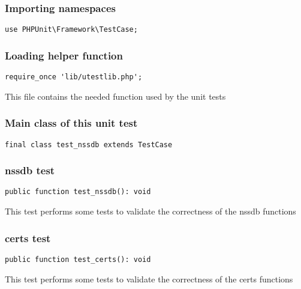 \documentclass[a4paper]{article}
\begin{document}
\subsubsection{Importing namespaces}

\begin{lstlisting}
use PHPUnit\Framework\TestCase;
\end{lstlisting}

\hypertarget{toc274}{}
\subsubsection{Loading helper function}

\begin{lstlisting}
require_once 'lib/utestlib.php';
\end{lstlisting}

This file contains the needed function used by the unit tests

\hypertarget{toc275}{}
\subsubsection{Main class of this unit test}

\begin{lstlisting}
final class test_nssdb extends TestCase
\end{lstlisting}

\hypertarget{toc276}{}
\subsubsection{nssdb test}

\begin{lstlisting}
public function test_nssdb(): void
\end{lstlisting}

This test performs some tests to validate the correctness
of the nssdb functions

\hypertarget{toc277}{}
\subsubsection{certs test}

\begin{lstlisting}
public function test_certs(): void
\end{lstlisting}

This test performs some tests to validate the correctness
of the certs functions

\hypertarget{toc278}{}
\end{document}
